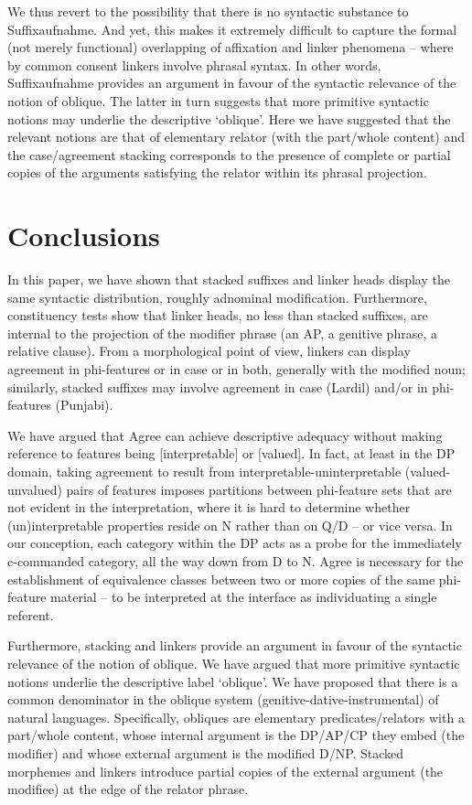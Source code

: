 \documentclass[output=paper]{langsci/langscibook}
\begin{document}
We thus revert to the possibility that there is no syntactic substance to Suffixaufnahme. And yet, this makes it extremely difficult to capture the formal (not merely functional) overlapping of affixation and linker phenomena – where by common consent linkers involve phrasal syntax. In other words, Suffixaufnahme provides an argument in favour of the syntactic relevance of the notion of oblique. The latter in turn suggests that more primitive syntactic notions may underlie the descriptive ‘oblique’. Here we have suggested that the relevant notions are that of elementary relator (with the part\slash whole content) and the case\slash agreement stacking corresponds to the presence of complete or partial copies of the arguments satisfying the relator within its phrasal projection. 

\section{Conclusions}%

In this paper, we have shown that stacked suffixes and linker heads display the same syntactic distribution, roughly adnominal modification. Furthermore, constituency tests show that linker heads, no less than stacked suffixes, are internal to the projection of the modifier phrase (an AP, a genitive phrase, a relative clause). From a morphological point of view, linkers can display agreement in phi-features or in case or in both, generally with the modified noun; similarly, stacked suffixes may involve agreement in case (Lardil) and\slash or in phi-features (Punjabi). 

  We have argued that Agree can achieve descriptive adequacy without making reference to features being [interpretable] or [valued]. In fact, at least in the DP domain, taking agreement to result from interpretable-uninterpretable (valued-unvalued) pairs of features imposes partitions between phi-feature sets that are not evident in the interpretation, where it is hard to determine whether (un)interpretable properties reside on N rather than on Q\slash D – or vice versa. In our conception, each category within the DP acts as a probe for the immediately c-commanded category, all the way down from D to N. Agree is necessary for the establishment of equivalence classes between two or more copies of the same phi-feature material – to be interpreted at the interface as individuating a single referent. 

Furthermore, stacking and linkers provide an argument in favour of the syntactic relevance of the notion of oblique. We have argued that more primitive syntactic notions underlie the descriptive label ‘oblique’. We have proposed that there is a common denominator in the oblique system (genitive-dative-instrumental) of natural languages. Specifically, obliques are elementary predicates\slash relators with a part\slash whole content, whose internal argument is the DP\slash AP\slash CP they embed (the modifier) and whose external argument is the modified D\slash NP. Stacked morphemes and linkers introduce partial copies of the external argument (the modifiee) at the edge of the relator phrase. 
\end{document}
